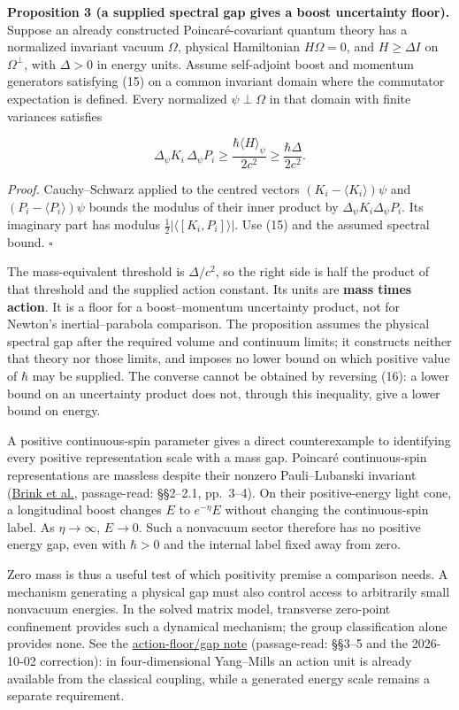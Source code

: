 \documentclass[11pt,a4paper]{article}
\begin{document}
\textbf{Proposition 3 (a supplied spectral gap gives a boost uncertainty
floor).} Suppose an already constructed Poincaré-covariant quantum
theory has a normalized invariant vacuum \(\Omega\), physical
Hamiltonian \(H\Omega=0\), and \(H\ge\Delta I\) on \(\Omega^\perp\),
with \(\Delta>0\) in energy units. Assume self-adjoint boost and
momentum generators satisfying (15) on a common invariant domain where
the commutator expectation is defined. Every normalized
\(\psi\perp\Omega\) in that domain with finite variances satisfies

\[
\Delta_\psi K_i\,\Delta_\psi P_i
\ge\frac{\hbar\langle H\rangle_\psi}{2c^2}
\ge\frac{\hbar\Delta}{2c^2}. \tag{16}
\]

\emph{Proof.} Cauchy--Schwarz applied to the centred vectors
\((K_i-\langle K_i\rangle)\psi\) and \((P_i-\langle P_i\rangle)\psi\)
bounds the modulus of their inner product by
\(\Delta_\psi K_i\Delta_\psi P_i\). Its imaginary part has modulus
\(\tfrac12|\langle[K_i,P_i]\rangle|\). Use (15) and the assumed spectral
bound. \(\square\)

The mass-equivalent threshold is \(\Delta/c^2\), so the right side is
half the product of that threshold and the supplied action constant. Its
units are \textbf{mass times action}. It is a floor for a
boost--momentum uncertainty product, not for Newton's inertial--parabola
comparison. The proposition assumes the physical spectral gap after the
required volume and continuum limits; it constructs neither that theory
nor those limits, and imposes no lower bound on which positive value of
\(\hbar\) may be supplied. The converse cannot be obtained by reversing
(16): a lower bound on an uncertainty product does not, through this
inequality, give a lower bound on energy.

A positive continuous-spin parameter gives a direct counterexample to
identifying every positive representation scale with a mass gap.
Poincaré continuous-spin representations are massless despite their
nonzero Pauli--Lubanski invariant
(\href{https://arxiv.org/pdf/hep-th/0205145v1}{Brink et al.},
passage-read: §§2--2.1, pp.~3--4). On their positive-energy light cone,
a longitudinal boost changes \(E\) to \(e^{-\eta}E\) without changing
the continuous-spin label. As \(\eta\to\infty\), \(E\to0\). Such a
nonvacuum sector therefore has no positive energy gap, even with
\(\hbar>0\) and the internal label fixed away from zero.

Zero mass is thus a useful test of which positivity premise a comparison
needs. A mechanism generating a physical gap must also control access to
arbitrarily small nonvacuum energies. In the solved matrix model,
transverse zero-point confinement provides such a dynamical mechanism;
the group classification alone provides none. See the
\href{low-dimensional-mass-gap.md\#conditional-orbit-area-bounds-and-state-counting}{action-floor/gap
note} (passage-read: §§3--5 and the 2026-10-02 correction): in
four-dimensional Yang--Mills an action unit is already available from
the classical coupling, while a generated energy scale remains a
separate requirement.
\end{document}
